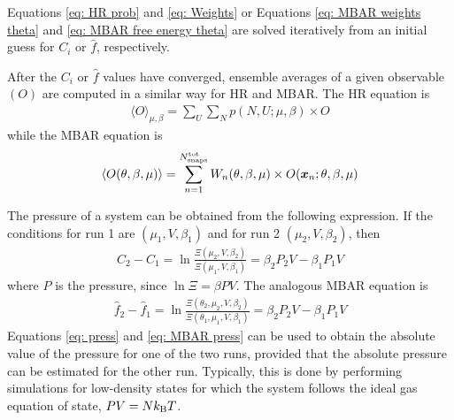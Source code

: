\documentclass[journal=jced,manuscript=article]{achemso}
\newcommand{\bfv}[1]{{\mbox{\boldmath{$#1$}}}}
\newcommand{\x}{\bfv{x}}
\begin{document}
Equations \ref{eq: HR prob} and \ref{eq: Weights} or Equations \ref{eq: MBAR weights theta} and \ref{eq: MBAR free energy theta} are solved iteratively from an initial guess for $C_i$ or $\hat f$, respectively.

After the $C_i$ or $\hat f$ values have converged, ensemble averages of a given observable $(O)$ are computed in a similar way for HR and MBAR. The HR equation is 
\begin{eqnarray} \label{eq: HR O}
\langle O \rangle_{\mu,\beta} = \sum_{U} \sum_{N} p(N,U;\mu,\beta) \times O
\end{eqnarray}
while the MBAR equation is
\begin{eqnarray} \label{eq: MBAR O theta}
\langle O(\theta,\beta,\mu)\rangle = \sum_{n=1}^{N^{\rm tot}_{\rm snaps}} W_{n}(\theta,\beta,\mu) \times O(\x_{n};\theta,\beta,\mu)
\end{eqnarray}

The pressure of a system can be obtained from the following expression. If the conditions for run 1 are $(\mu_1, V, \beta_1)$ and for run 2 $(\mu_2, V, \beta_2)$, then
\begin{eqnarray} \label{eq: press}
C_2 - C_1 = \ln \frac{\Xi (\mu_2,V,\beta_2)}{\Xi (\mu_1,V,\beta_1)} = \beta_2 P_2 V - \beta_1 P_1 V
\end{eqnarray}
where $P$ is the pressure, since $\ln \Xi = \beta P V$. The analogous MBAR equation is
\begin{eqnarray} \label{eq: MBAR press}
\hat f_2 - \hat f_1 = \ln \frac{\Xi (\theta_2,\mu_2,V,\beta_2)}{\Xi (\theta_1,\mu_1,V,\beta_1)} = \beta_2 P_2 V - \beta_1 P_1 V
\end{eqnarray}
Equations \ref{eq: press} and \ref{eq: MBAR press} can be used to obtain the absolute value of the pressure for one of the two runs, provided that the absolute pressure can be estimated for the other run. Typically, this is done by performing simulations for low-density states for which the system follows the ideal gas equation of state, $P V = N k_{\rm B} T$. 
\end{document}
